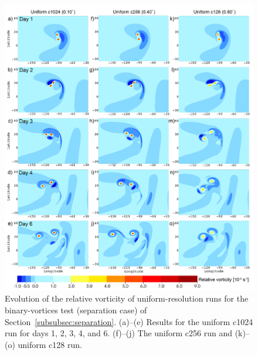 \begin{figure}
    \centerline{%
    \noindent
    \includegraphics[width=\textwidth]{Chap1/new_uniform_lsplit}}
    \caption{Evolution of the relative vorticity of uniform-resolution runs
    for the binary-vortices test (separation case) of
Section~\ref{subsubsec:separation}.
  (a)--(e) Results for
    the uniform c1024 run for days 1, 2, 3, 4, and 6.  (f)--(j) The
    uniform c256 run and (k)--(o) uniform c128 run.}%
    \label{fig:lsplit_uni}
\end{figure}
%
